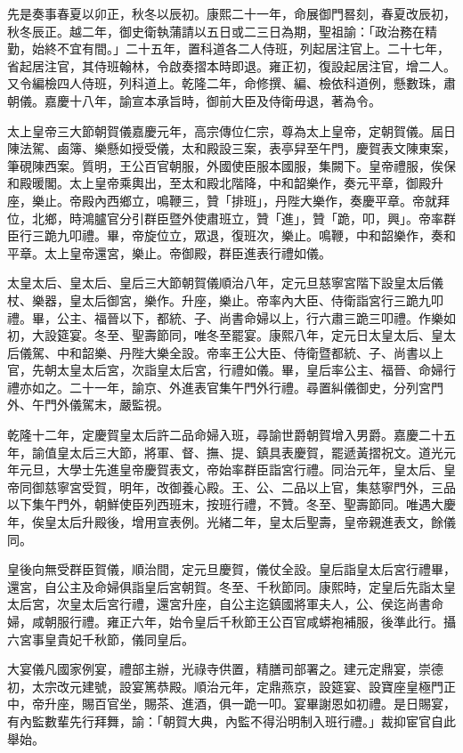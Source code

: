 \begin{pinyinscope}
先是奏事春夏以卯正，秋冬以辰初。康熙二十一年，命展御門晷刻，春夏改辰初，秋冬辰正。越二年，御史衛執蒲請以五日或二三日為期，聖祖諭：「政治務在精勤，始終不宜有間。」二十五年，置科道各二人侍班，列起居注官上。二十七年，省起居注官，其侍班翰林，令啟奏摺本時即退。雍正初，復設起居注官，增二人。又令編檢四人侍班，列科道上。乾隆二年，命修撰、編、檢依科道例，懸數珠，肅朝儀。嘉慶十八年，諭宣本承旨時，御前大臣及侍衛毋退，著為令。

太上皇帝三大節朝賀儀嘉慶元年，高宗傳位仁宗，尊為太上皇帝，定朝賀儀。屆日陳法駕、鹵簿、樂懸如授受儀，太和殿設三案，表亭舁至午門，慶賀表文陳東案，筆硯陳西案。質明，王公百官朝服，外國使臣服本國服，集闕下。皇帝禮服，俟保和殿暖閣。太上皇帝乘輿出，至太和殿北階降，中和韶樂作，奏元平章，御殿升座，樂止。帝殿內西鄉立，鳴鞭三，贊「排班」，丹陛大樂作，奏慶平章。帝就拜位，北鄉，時鴻臚官分引群臣暨外使肅班立，贊「進」，贊「跪，叩，興」。帝率群臣行三跪九叩禮。畢，帝旋位立，眾退，復班次，樂止。鳴鞭，中和韶樂作，奏和平章。太上皇帝還宮，樂止。帝御殿，群臣進表行禮如儀。

太皇太后、皇太后、皇后三大節朝賀儀順治八年，定元旦慈寧宮階下設皇太后儀杖、樂器，皇太后御宮，樂作。升座，樂止。帝率內大臣、侍衛詣宮行三跪九叩禮。畢，公主、福晉以下，都統、子、尚書命婦以上，行六肅三跪三叩禮。作樂如初，大設筵宴。冬至、聖壽節同，唯冬至罷宴。康熙八年，定元日太皇太后、皇太后儀駕、中和韶樂、丹陛大樂全設。帝率王公大臣、侍衛暨都統、子、尚書以上官，先朝太皇太后宮，次詣皇太后宮，行禮如儀。畢，皇后率公主、福晉、命婦行禮亦如之。二十一年，諭京、外進表官集午門外行禮。尋置糾儀御史，分列宮門外、午門外儀駕末，嚴監視。

乾隆十二年，定慶賀皇太后許二品命婦入班，尋諭世爵朝賀增入男爵。嘉慶二十五年，諭值皇太后三大節，將軍、督、撫、提、鎮具表慶賀，罷遞黃摺祝文。道光元年元旦，大學士先進皇帝慶賀表文，帝始率群臣詣宮行禮。同治元年，皇太后、皇帝同御慈寧宮受賀，明年，改御養心殿。王、公、二品以上官，集慈寧門外，三品以下集午門外，朝鮮使臣列西班末，按班行禮，不贊。冬至、聖壽節同。唯遇大慶年，俟皇太后升殿後，增用宣表例。光緒二年，皇太后聖壽，皇帝親進表文，餘儀同。

皇後向無受群臣賀儀，順治間，定元旦慶賀，儀仗全設。皇后詣皇太后宮行禮畢，還宮，自公主及命婦俱詣皇后宮朝賀。冬至、千秋節同。康熙時，定皇后先詣太皇太后宮，次皇太后宮行禮，還宮升座，自公主迄鎮國將軍夫人，公、侯迄尚書命婦，咸朝服行禮。雍正六年，始令皇后千秋節王公百官咸蟒袍補服，後準此行。攝六宮事皇貴妃千秋節，儀同皇后。

大宴儀凡國家例宴，禮部主辦，光祿寺供置，精膳司部署之。建元定鼎宴，崇德初，太宗改元建號，設宴篤恭殿。順治元年，定鼎燕京，設筵宴、設寶座皇極門正中，帝升座，賜百官坐，賜茶、進酒，俱一跪一叩。宴畢謝恩如初禮。是日賜宴，有內監數輩先行拜舞，諭：「朝賀大典，內監不得沿明制入班行禮。」裁抑宦官自此舉始。


\end{pinyinscope}
